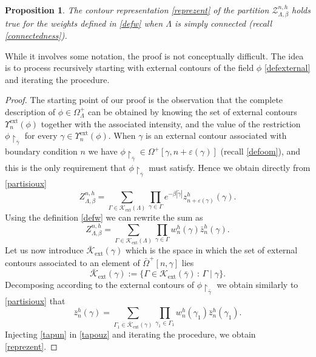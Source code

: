 \documentclass[JEP,XML,SOM,Unicode, NoFloatCountersInSection]{cedram}
\let\mathcal\mathscr
\newcommand{\sep}{\,:\,}
\numberwithin{equation}{section}
\theoremstyle{plain}
\newtheorem{proposition}[theorem]{Proposition}
\theoremstyle{definition}
\newcommand{\ext}{\mathrm{ext}}
\newcommand{\restrict}{\!\!\upharpoonright}
\newcommand{\cZ}{{\ensuremath{\mathcal Z}} }
\newcommand{\cK}{{\ensuremath{\mathcal K}} }
\newcommand{\gb}{\beta}
\newcommand{\gep}{\varepsilon}
\newcommand{\gG}{\Gamma}
\newcommand{\gO}{\Omega}
\newcommand{\gL}{\Lambda}
\begin{document}
\begin{proposition}\label{trax}
The contour representation \eqref{reprezent} of the partition $\cZ^{n,h}_{\gL,\gb}$ holds true for the weights defined in \eqref{defw}
when $\gL$ is simply connected (recall \eqref{connectedness}).
\end{proposition}

While it involves some notation, the proof is not conceptually difficult.
The idea is to process recursively starting with external contours of the field $\phi$ \eqref{defexternal} and iterating the procedure.

\begin{proof}

The starting point of our proof is the observation that the complete descrip\-tion of
$\phi\in \gO^+_{\gL}$ can be obtained by knowing the set of external contours $\Upsilon^{\ext}_n(\phi)$ together with the associated intensity,
and the value of the restriction $\phi\restrict_{\bar \gamma}$ for every $\gamma\in \Upsilon^{\ext}_n(\phi)$.
When $\gamma$ is an external contour associated with boundary condition $n$ we have
$\phi\restrict_{\bar \gamma}\in \gO^+[\gamma,n+\gep(\gamma)]$ (recall \eqref{defoom}), and this is the only requirement that $\phi\restrict_{\bar \gamma}$
must satisfy.
Hence we obtain directly from \eqref{partisioux}
\begin{equation*}%
Z^{n,h}_{\gL,\gb}
=\sum_{\gG\in \cK_{\ext}(\gL)}\prod_{\gamma\in \gG} e^{-\gb |\tilde \gamma|} z^h_{n+\gep(\gamma)}(\gamma).
\end{equation*}
Using the definition \eqref{defw} we can rewrite the sum as
\begin{equation}\label{tapouz}
Z^{n,h}_{\gL,\gb}
=\sum_{\gG\in \cK_{\ext}(\gL)}\prod_{\gamma\in \gG} w^h_n(\gamma) \bar z^h_n(\gamma).
\end{equation}
Let us now introduce $\bar \cK_{\ext}(\gamma)$ which is the space in which the set of external contours associated to an element of $\bar \gO^+[n,\gamma]$ lies
\begin{equation}\label{daext}
\bar \cK_{\ext}(\gamma):=\{ \gG \in \cK_{\ext}(\bar \gamma) \sep \gG \mid \gamma \}.
\end{equation}
Decomposing according to the external contours of $\phi\restrict_{\bar \gamma}$ we obtain similarly to \eqref{partisioux} that
\begin{equation}\label{tapun}
\bar z^h_n(\gamma)= \sum_{\gG_1\in \bar \cK_{\ext}(\gamma)}\prod_{\gamma_1\in \gG_1}
w^h_n(\gamma_1) \bar z^h_n(\gamma_1).
\end{equation}
Injecting \eqref{tapun} in \eqref{tapouz} and iterating the procedure, we obtain \eqref{reprezent}.
\end{proof}
\end{document}
